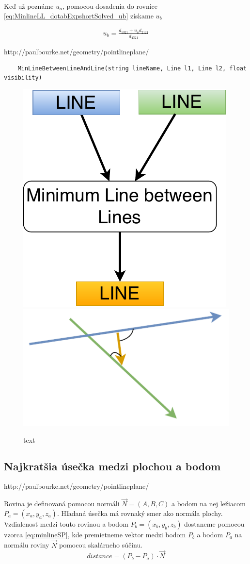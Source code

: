 Keď už poznáme $u_a$, pomocou dosadenia do rovnice \ref{eq:MinlineLL_dotabExpshortSolved_ub} získame $u_b$ 

\begin{equation}
\begin{aligned}
u_b  = \frac{d_{1321} + u_a d_{2121}}{d_{4321}}
\end{aligned}
    \label{eq:MinlineLL_dotabExpshortSolved_ub}
\end{equation}


http://paulbourke.net/geometry/pointlineplane/
\begin{lstlisting}
	MinLineBetweenLineAndLine(string lineName, Line l1, Line l2, float visibility)
\end{lstlisting}

\begin{figure}[H]
	\centering
	\includegraphics[height=0.3\textwidth]{obrazky-figures/Diagram/Line/DP Navrh operacii-1D - LineMinLL.pdf}
	\includegraphics[height=0.3\textwidth]{obrazky-figures/Diagram/Draw/2Line/DP Navrh operacii-1D - LineMinLL.pdf}
	\caption{text}
	\label{fig:1}
\end{figure}


\subsection{Najkratšia úsečka medzi plochou a bodom}
http://paulbourke.net/geometry/pointlineplane/


Rovina je definovaná pomocou normáli $\overrightarrow{N}=(A, B, C)$ a bodom na nej ležiacom $P_a=(x_a,y_a,z_a)$.
Hľadaná úsečka má rovnaký smer ako normála plochy.
Vzdialenosť medzi touto rovinou a bodom $P_b=(x_b,y_b,z_b)$ dostaneme pomocou vzorca \ref{eq:minlineSP}, kde premietneme vektor medzi bodom $P_b$ a bodom $P_a$ na normálu roviny $\overrightarrow{N}$ pomocou skalárneho súčinu. 
\begin{equation}
 distance = (P_b - P_a) \cdot \overrightarrow{N}
    \label{eq:minlineSP}
\end{equation}

